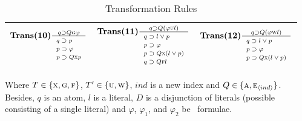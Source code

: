 \documentclass[letterpaper]{article}
\begin{document}
\begin{table*}[]
\begin{tabular}{l  l l}
$\textbf{Trans(10)} \frac{q\supset Q\GLOBAL \varphi}{\scriptsize \begin{array}{ll}
  q \supset  p\\
  p\supset \varphi\\
  p\supset Q\NEXT p
  \end{array}  }$    & 
$\textbf{Trans(11)} \frac{q\supset Q(\varphi \UNTIL l)}{\scriptsize \begin{array}{ll}
  q \supset l\vee p\\
  p\supset \varphi\\
  p\supset Q\NEXT(l\vee p)\\
  q\supset Q \FUTURE l
  \end{array}  }$
&   $\textbf{Trans(12)} \frac{q\supset Q(\varphi \UNLESS l)}{\scriptsize \begin{array}{ll}
  q \supset l\vee p\\
  p\supset \varphi\\
  p\supset Q\NEXT(l\vee p)
  \end{array}  }$\\
\hline
    \end{tabular}
    \caption{Transformation Rules}
    \label{tab:trans}
    Where $T\in \{\textsc{x}, \textsc{g}, \textsc{f}\}$, $T'\in \{\textsc{u}, \textsc{w}\}$, $ind$ is a new index and $Q\in \{\textsc{a}, \textsc{e}_{{\langle{ind}\rangle}}\}$. Besides, $q$ is an atom, $l$ is a literal, $D$ is a disjunction of literals (possible consisting of a single literal) and $\varphi$, $\varphi_1$, and $\varphi_2$ be \CTL\ formulae.
\end{table*}
\end{document}
